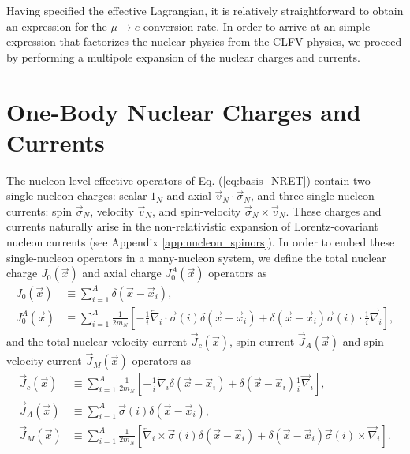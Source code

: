 \documentclass[12pt,letterpaper]{book}
\begin{document}
Having specified the effective Lagrangian, it is relatively straightforward to obtain an expression for the $\mu\rightarrow e$ conversion rate. In order to arrive at an simple expression that factorizes the nuclear physics from the CLFV physics, we proceed by performing a multipole expansion of the nuclear charges and currents. 
\section{One-Body Nuclear Charges and Currents}
The nucleon-level effective operators of Eq. (\ref{eq:basis_NRET}) contain two single-nucleon charges: scalar $1_N$ and axial $\vec{v}_N\cdot\vec{\sigma}_N$, and three single-nucleon currents: spin $\vec{\sigma}_N$, velocity $\vec{v}_N$, and spin-velocity $\vec{\sigma}_N\times\vec{v}_N$. These charges and currents naturally arise in the non-relativistic expansion of Lorentz-covariant nucleon currents (see Appendix \ref{app:nucleon_spinors}). In order to embed these single-nucleon operators in a many-nucleon system, we define the total nuclear charge $J_0(\vec{x})$ and axial charge $J_0^A(\vec{x})$ operators as
\begin{equation}
\begin{split}
J_0(\vec{x})&\equiv\sum_{i=1}^A \delta(\vec{x}-\vec{x}_i),\\
J_0^A(\vec{x})&\equiv\sum_{i=1}^A \frac{1}{2m_N}\left[-\frac{1}{i}\overleftarrow{\nabla}_i\cdot\vec{\sigma}(i)\delta(\vec{x}-\vec{x}_i)+\delta(\vec{x}-\vec{x}_i)\vec{\sigma}(i)\cdot\frac{1}{i}\overrightarrow{\nabla}_i\right],
\end{split}
\end{equation}
and the total nuclear velocity current $\vec{J}_c(\vec{x})$, spin current $\vec{J}_A(\vec{x})$ and spin-velocity current $\vec{J}_M(\vec{x})$ operators as
\begin{equation}
\begin{split}
\vec{J}_c(\vec{x})&\equiv\sum_{i=1}^A \frac{1}{2m_N}\left[-\frac{1}{i}\overleftarrow{\nabla}_i\delta(\vec{x}-\vec{x}_i)+\delta(\vec{x}-\vec{x}_i)\frac{1}{i}\overrightarrow{\nabla}_i\right],\\
\vec{J}_A(\vec{x})&\equiv\sum_{i=1}^A\vec{\sigma}(i)\delta(\vec{x}-\vec{x}_i),\\
\vec{J}_M(\vec{x})&\equiv\sum_{i=1}^A \frac{1}{2m_N}\left[\overleftarrow{\nabla}_i\times\vec{\sigma}(i)\delta(\vec{x}-\vec{x}_i)+\delta(\vec{x}-\vec{x}_i)\vec{\sigma}(i)\times\overrightarrow{\nabla}_i\right].
\end{split}
\end{equation}
\end{document}
